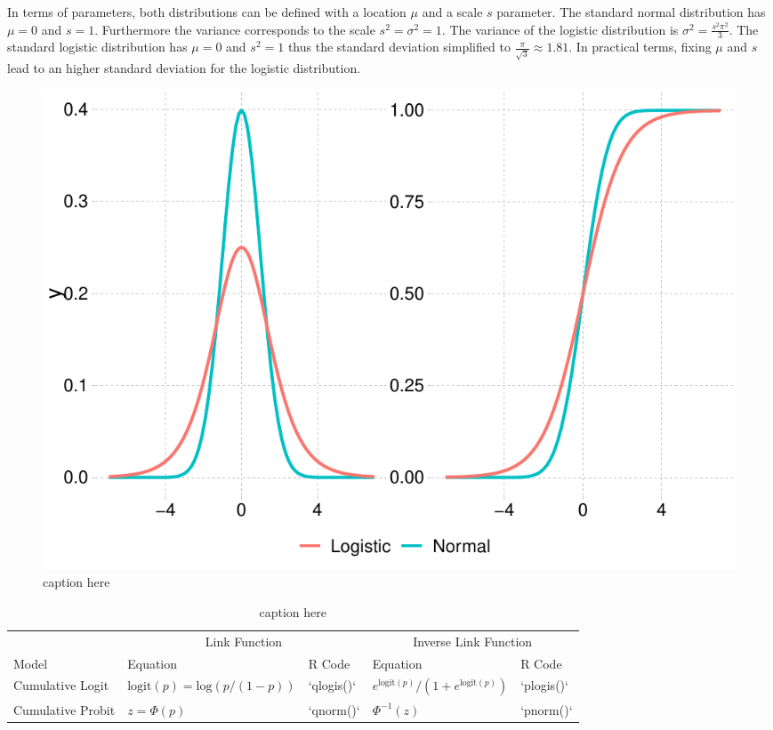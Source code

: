 \documentclass[
  man,floatsintext]{apa6}
\begin{document}
In terms of parameters, both distributions can be defined with a location \(\mu\) and a scale \(s\) parameter. The standard normal distribution has \(\mu = 0\) and \(s = 1\). Furthermore the variance corresponds to the scale \(s^2 = \sigma^2 = 1\). The variance of the logistic distribution is \(\sigma^2 = \frac{s^2\pi^2}{3}\). The standard logistic distribution has \(\mu = 0\) and \(s^2 = 1\) thus the standard deviation simplified to \(\frac{\pi}{\sqrt{3}} \approx 1.81\). In practical terms, fixing \(\mu\) and \(s\) lead to an higher standard deviation for the logistic distribution.

\scriptsize

\begin{figure}

{\centering \includegraphics{paper-new_files/figure-latex/fig-logit-vs-probit-1} 

}

\caption{caption here}\label{fig:fig-logit-vs-probit}
\end{figure}

\normalsize

\scriptsize

\begin{table}

\caption{\label{tab:tab-model-summary}caption here}
\centering
\begin{tabular}[t]{lllll}
\toprule
\multicolumn{1}{c}{} & \multicolumn{2}{c}{Link Function} & \multicolumn{2}{c}{Inverse Link Function} \\
\cmidrule(l{3pt}r{3pt}){2-3} \cmidrule(l{3pt}r{3pt}){4-5}
Model & Equation & R Code & Equation & R Code\\
\midrule
Cumulative Logit & $\text{logit}(p) = \text{log}(p / (1-p))$ & `qlogis()` & $e^{\text{logit}(p)} / (1 + e^{\text{logit}(p)})$ & `plogis()`\\
Cumulative Probit & $z = \Phi(p)$ & `qnorm()` & $\Phi^{-1}(z)$ & `pnorm()`\\
\bottomrule
\end{tabular}
\end{table}
\end{document}
